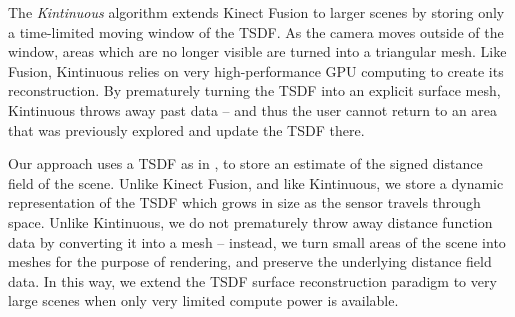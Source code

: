 \documentclass[conference,10pt]{IEEEtran}
\begin{document}
The \emph{Kintinuous} \cite{Whelan2013} algorithm extends Kinect Fusion to
larger scenes by storing only a time-limited moving window of the TSDF. As the camera
moves outside of the window, areas which are no longer visible are turned into a
triangular mesh. Like Fusion, Kintinuous relies on very high-performance GPU
computing to create its reconstruction.  By prematurely turning the TSDF into an
explicit surface mesh, Kintinuous throws away past data -- and thus the user
cannot return to an area that was previously explored and update the TSDF there.

Our approach uses a TSDF as in
\cite{Curless1996,Newcombe,Whelan2013,Bylow2013}, to store an
estimate of the signed distance field of the scene. Unlike Kinect Fusion, and like Kintinuous,
we store a dynamic representation of the TSDF which grows in size as the sensor
travels through space. Unlike Kintinuous, we do not prematurely throw away
distance function data by converting it into a mesh -- instead, we turn small
areas of the scene into meshes for the purpose of rendering, and preserve the
underlying distance field data. In this way, we extend the TSDF surface
reconstruction paradigm to very large scenes when only very limited compute
power is available.
\end{document}

